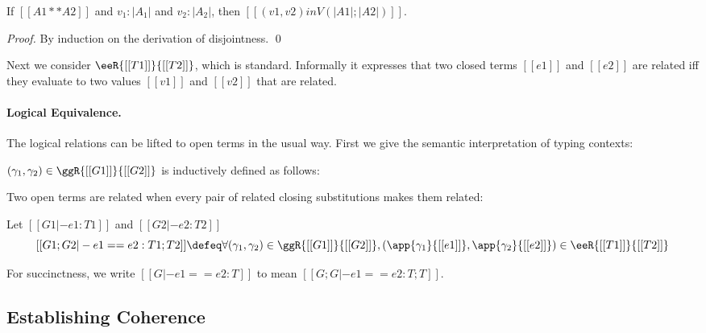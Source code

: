 \begin{lemma}\label{lemma:disjoint}
  If $[[A1 ** A2]]$ and $v_1 : |A_1|$ and $v_2 : |A_2|$, then $[[(v1, v2) in V (|A1| ; |A2|)]]$.
\end{lemma}
\begin{proof}
  By induction on the derivation of disjointness. \qed
\end{proof}

Next we consider $\eeR{[[T1]]}{[[T2]]}$, which is standard. Informally it expresses
that two closed terms $[[e1]]$ and $[[e2]]$ are related iff
they evaluate to two values $[[v1]]$ and $[[v2]]$ that are related.



\paragraph{Logical Equivalence.}
The logical relations can be lifted to open terms in the usual way. First we give the
semantic interpretation of typing contexts:
\begin{definition}
  $(\gamma_1, \gamma_2) \in \ggR{[[G1]]}{[[G2]]}$ is inductively defined as follows:
\end{definition}
Two open terms are related when every pair of related closing substitutions
makes them related:
\begin{definition}
  Let $[[G1 |- e1 : T1]]$ and $[[G2 |- e2 : T2]]$
  \[
    [[G1 ; G2 |- e1 == e2 : T1 ; T2]] \defeq \forall (\gamma_1, \gamma_2) \in
    \ggR{[[G1]]}{[[G2]]}, (\app{\gamma_1}{[[e1]]}, \app{\gamma_2}{[[e2]]}) \in
    \eeR{[[T1]]}{[[T2]]}
  \]
\end{definition}
For succinctness, we write $[[G |- e1 == e2 : T]]$ to mean $[[G ; G |- e1 == e2 : T ; T]]$.


\subsection{Establishing Coherence}

